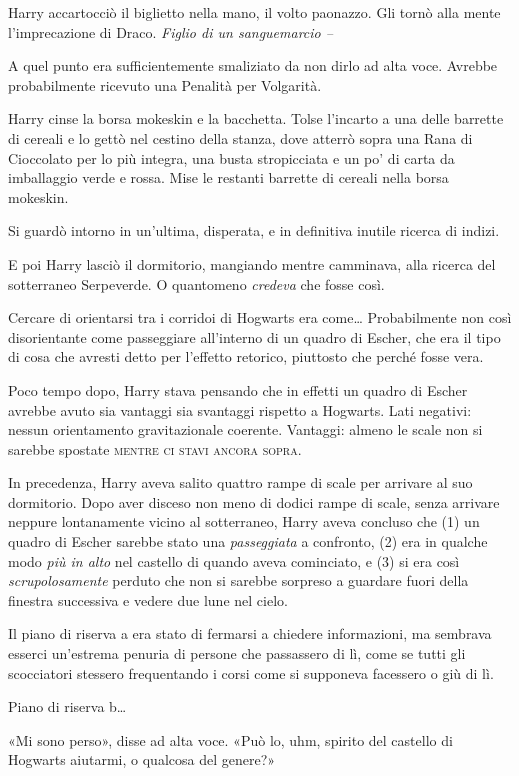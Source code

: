 Harry accartocciò il biglietto nella mano, il volto paonazzo. Gli tornò alla mente l’imprecazione di Draco. \textit{Figlio di un sanguemarcio –}

A quel punto era sufficientemente smaliziato da non dirlo ad alta voce. Avrebbe probabilmente ricevuto una Penalità per Volgarità.

Harry cinse la borsa mokeskin e la bacchetta. Tolse l’incarto a una delle barrette di cereali e lo gettò nel cestino della stanza, dove atterrò sopra una Rana di Cioccolato per lo più integra, una busta stropicciata e un po’ di carta da imballaggio verde e rossa. Mise le restanti barrette di cereali nella borsa mokeskin.

Si guardò intorno in un’ultima, disperata, e in definitiva inutile ricerca di indizi.

E poi Harry lasciò il dormitorio, mangiando mentre camminava, alla ricerca del sotterraneo Serpeverde. O quantomeno \textit{credeva} che fosse così.

Cercare di orientarsi tra i corridoi di Hogwarts era come… Probabilmente non così disorientante come passeggiare all’interno di un quadro di Escher, che era il tipo di cosa che avresti detto per l’effetto retorico, piuttosto che perché fosse vera.

Poco tempo dopo, Harry stava pensando che in effetti un quadro di Escher avrebbe avuto sia vantaggi sia svantaggi rispetto a Hogwarts. Lati negativi: nessun orientamento gravitazionale coerente. Vantaggi: almeno le scale non si sarebbe spostate \textsc{mentre ci stavi ancora sopra.}

In precedenza, Harry aveva salito quattro rampe di scale per arrivare al suo dormitorio. Dopo aver disceso non meno di dodici rampe di scale, senza arrivare neppure lontanamente vicino al sotterraneo, Harry aveva concluso che (1) un quadro di Escher sarebbe stato una \textit{passeggiata} a confronto, (2) era in qualche modo \textit{più in alto} nel castello di quando aveva cominciato, e (3) si era così \textit{scrupolosamente} perduto che non si sarebbe sorpreso a guardare fuori della finestra successiva e vedere due lune nel cielo.

Il piano di riserva a era stato di fermarsi a chiedere informazioni, ma sembrava esserci un’estrema penuria di persone che passassero di lì, come se tutti gli scocciatori stessero frequentando i corsi come si supponeva facessero o giù di lì.

Piano di riserva b…

«Mi sono perso», disse ad alta voce. «Può lo, uhm, spirito del castello di Hogwarts aiutarmi, o qualcosa del genere?»

